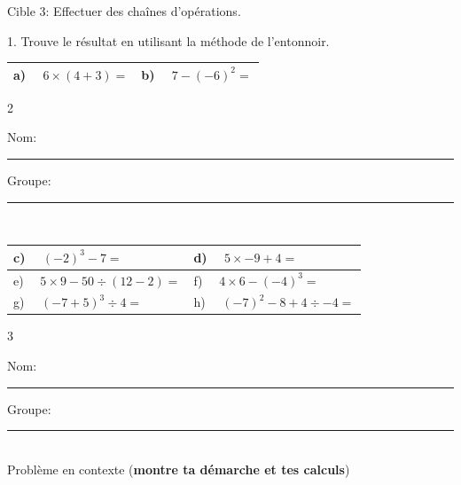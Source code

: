\documentclass[11pt]{article}
\newcommand{\entete}{%
  \noindent Nom: \rule{6.5cm}{0.4pt} \hfill Groupe: \rule{3cm}{0.4pt}\\[4mm]
}
\begin{document}
\vspace{5mm}

\begin{cible}{Cible 3: Effectuer des chaînes d'opérations.}

1. Trouve le résultat en utilisant la méthode de l'entonnoir.

\vspace{2mm}
\renewcommand{\arraystretch}{1}
\begin{tabular}{|p{7.7cm}|p{7.7cm}|}
\hline
a) $\quad 6 \times (4+3) = $ & b) $\quad 7 - (-6)^2 = $ \\[3.2cm]
\hline
\end{tabular}

\end{cible}

\vfill
\begin{center}
2
\end{center}

\newpage

\entete

\renewcommand{\arraystretch}{1}
\begin{tabular}{|p{7.7cm}|p{7.7cm}|}
\hline
\rule{0pt}{4mm} c) $\quad (-2)^3 - 7 = $ & d) $\quad 5 \times -9 + 4 = $ \\[3.2cm]
\hline
\rule{0pt}{4mm} e) $\quad 5 \times 9 - 50 \div (12-2) = $ & f) $\quad 4 \times 6 - (-4)^3 = $ \\[3.2cm]
\hline
\rule{0pt}{4mm} g) $\quad (-7+5)^3 \div 4 = $ & h) $\quad (-7)^2 - 8 + 4 \div -4 = $ \\[3.2cm]
\hline
\end{tabular}

\vfill
\begin{center}
3
\end{center}

\newpage

\entete

\noindent Problème en contexte (\textbf{montre ta démarche et tes calculs})
\end{document}
